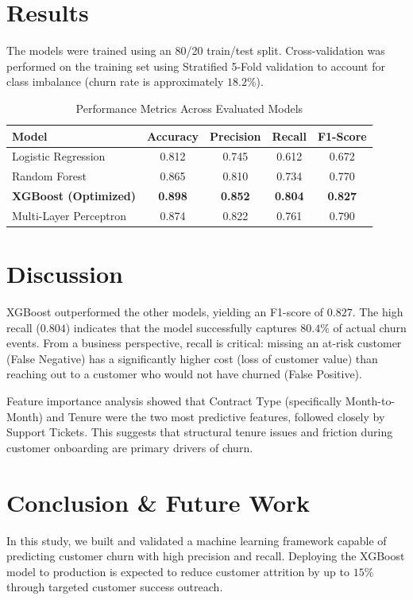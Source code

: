 \documentclass[11pt, a4paper]{article}
\begin{document}
\section{Results}
The models were trained using an 80/20 train/test split. Cross-validation was performed on the training set using Stratified 5-Fold validation to account for class imbalance (churn rate is approximately $18.2\%$).

\begin{table}[h]
\centering
\begingroup
\setlength{\parindent}{0pt}
\setlength{\parskip}{0pt}
\caption{Performance Metrics Across Evaluated Models}
\label{tab:results}
\vspace{0.5em}
\begin{tabular}{l c c c c}
\toprule
Model & Accuracy & Precision & Recall & F1-Score \\
\midrule
Logistic Regression & 0.812 & 0.745 & 0.612 & 0.672 \\
Random Forest & 0.865 & 0.810 & 0.734 & 0.770 \\
\textbf{XGBoost (Optimized)} & \textbf{0.898} & \textbf{0.852} & \textbf{0.804} & \textbf{0.827} \\
Multi-Layer Perceptron & 0.874 & 0.822 & 0.761 & 0.790 \\
\bottomrule
\end{tabular}
\endgroup
\end{table}

\section{Discussion}
XGBoost outperformed the other models, yielding an F1-score of $0.827$. The high recall ($0.804$) indicates that the model successfully captures $80.4\%$ of actual churn events. From a business perspective, recall is critical: missing an at-risk customer (False Negative) has a significantly higher cost (loss of customer value) than reaching out to a customer who would not have churned (False Positive).

Feature importance analysis showed that Contract Type (specifically Month-to-Month) and Tenure were the two most predictive features, followed closely by Support Tickets. This suggests that structural tenure issues and friction during customer onboarding are primary drivers of churn.

\section{Conclusion \& Future Work}
In this study, we built and validated a machine learning framework capable of predicting customer churn with high precision and recall. Deploying the XGBoost model to production is expected to reduce customer attrition by up to $15\%$ through targeted customer success outreach.
\end{document}
